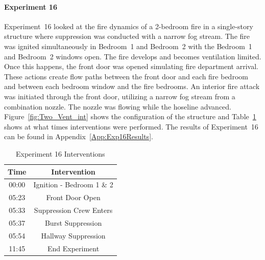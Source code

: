 \documentclass[12pt,oneside]{book}
\begin{document}
\paragraph{Experiment 16}
Experiment~16 looked at the fire dynamics of a 2-bedroom fire in a single-story structure where suppression was conducted with a narrow fog stream. The fire was ignited simultaneously in Bedroom~1 and Bedroom~2 with the Bedroom~1 and Bedroom~2 windows open. The fire develops and becomes ventilation limited. Once this happens, the front door was opened simulating fire department arrival. These actions create flow paths between the front door and each fire bedroom and between each bedroom window and the fire bedrooms. An interior fire attack was initiated through the front door, utilizing a narrow fog stream from a combination nozzle. The nozzle was flowing while the hoseline advanced. Figure~\ref{fig:Two_Vent_int} shows the configuration of the structure and Table~\ref{Table:Exp16Interventions} shows at what times interventions were performed. The results of Experiment~16 can be found in Appendix~\ref{App:Exp16Results}. 


\begin{table}[H]
	\centering
	\caption{Experiment 16 Interventions}
	\begin{tabular}{|c|c|} 
		\hline
		Time & Intervention \\ \hline \hline
		00:00 & Ignition - Bedroom 1 \& 2 \\ \hline
		05:23 & Front Door Open \\ \hline
		05:33 & Suppression Crew Enters\\ \hline
		05:37 & Burst Suppression \\ \hline 
		05:54 & Hallway Suppression \\ \hline
		11:45 & End Experiment\\ \hline
	\end{tabular}
	\label{Table:Exp16Interventions}
\end{table}

\FloatBarrier
\end{document}
